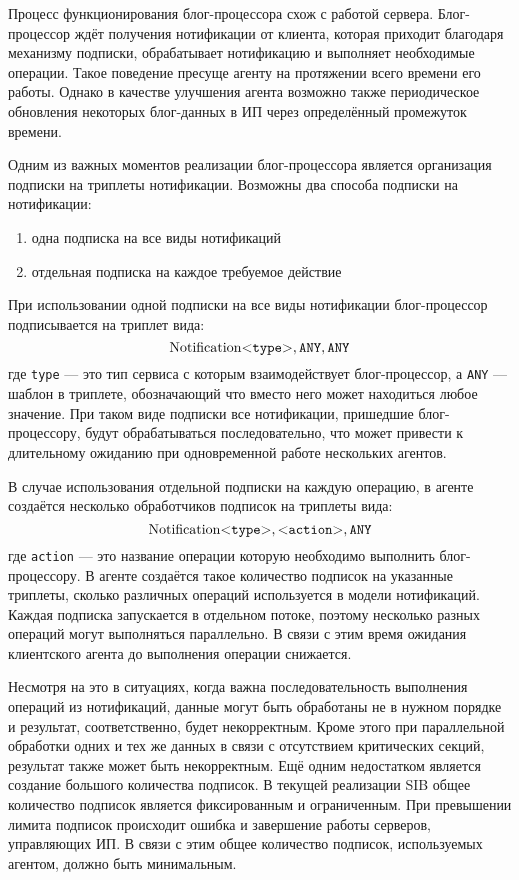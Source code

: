 Процесс функционирования блог-процессора схож с работой сервера. Блог-процессор ждёт получения нотификации от клиента, которая приходит благодаря механизму подписки, обрабатывает нотификацию и выполняет необходимые операции. Такое поведение пресуще агенту на протяжении всего времени его работы. Однако в качестве улучшения агента возможно также периодическое обновления некоторых блог-данных в ИП через определённый промежуток времени.

Одним из важных моментов реализации блог-процессора является организация подписки на триплеты нотификации. Возможны два способа подписки на нотификации: 
\begin{enumerate}
\item одна подписка на все виды нотификаций
\item отдельная подписка на каждое требуемое действие
\end{enumerate}

При использовании одной подписки на все виды нотификации блог-процессор подписывается на триплет вида:
$$
\mathrm{Notification} \mbox{<{\tt type}>}, \mbox{\tt ANY}, \mbox{\tt ANY}
$$
где {\tt type} --- это тип сервиса с которым взаимодействует блог-процессор, а {\tt ANY} --- шаблон в триплете, обозначающий что вместо него может находиться любое значение. При таком виде подписки все нотификации, пришедшие блог-процессору, будут обрабатываться последовательно, что может привести к длительному ожиданию при одновременной работе нескольких агентов. 

В случае использования отдельной подписки на каждую операцию, в агенте создаётся несколько обработчиков подписок на триплеты вида:
$$
\mathrm{Notification} \mbox{<{\tt type}>}, \mbox{<{\tt action}>}, \mbox{\tt ANY}
$$
где {\tt action} --- это название операции которую необходимо выполнить блог-процессору. В агенте создаётся такое количество подписок на указанные триплеты, сколько различных операций используется в модели нотификаций. Каждая подписка запускается в отдельном потоке, поэтому несколько разных операций могут выполняться параллельно. В связи с этим время ожидания клиентского агента до выполнения операции снижается. 

Несмотря на это в ситуациях, когда важна последовательность выполнения операций из нотификаций, данные могут быть обработаны не в нужном порядке и результат, соответственно, будет некорректным. Кроме этого при параллельной обработки одних и тех же данных в связи с отсутствием критических секций, результат также может быть некорректным. Ещё одним недостатком является создание большого количества подписок. В текущей реализации SIB общее количество подписок является фиксированным и ограниченным. При превышении лимита подписок происходит ошибка и завершение работы серверов, управляющих ИП. В связи с этим общее количество подписок, используемых агентом, должно быть минимальным.


